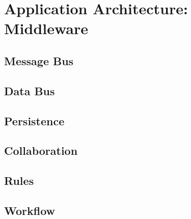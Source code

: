 \documentclass[a4paper,10pt, openany]{book}
\begin{document}
\part{Application Architecture: Middleware}

\chapter{Message Bus}

\chapter{Data Bus}

\chapter{Persistence}

\chapter{Collaboration}

\chapter{Rules}

\chapter{Workflow}

\appendix
\end{document}
